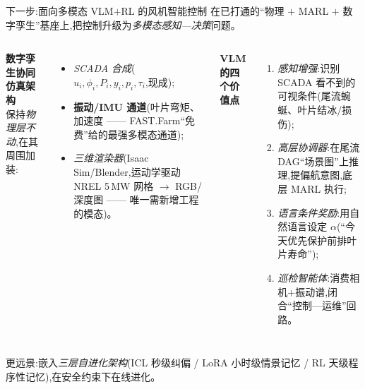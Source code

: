 \documentclass[aspectratio=169,11pt,UTF8]{ctexbeamer}
\newcommand{\emphb}[1]{\textcolor{myred}{\textbf{#1}}}
\begin{document}
\begin{frame}{下一步:面向多模态 VLM$+$RL 的风机智能控制}
\small
在已打通的“物理 $+$ MARL $+$ 数字孪生”基座上,把控制升级为\emph{多模态感知—决策}问题。
\begin{columns}[T]
\textbf{数字孪生协同仿真架构}\\
保持\emph{物理层不动},在其周围加装:
\begin{itemize}\setlength\itemsep{1pt}
  \item \emph{SCADA 合成}($u_i,\phi_i,P_i,y_i,p_i,\tau_i$,现成);
  \item \emphb{振动/IMU 通道}(叶片弯矩、加速度 —— FAST.Farm“免费”给的最强多模态通道);
  \item \emph{三维渲染器}(Isaac Sim/Blender,运动学驱动 NREL 5\,MW 网格 $\to$ RGB/深度图 —— 唯一需新增工程的模态)。
\end{itemize}
\textbf{VLM 的四个价值点}
\begin{enumerate}\setlength\itemsep{1pt}
  \item \emph{感知增强}:识别 SCADA 看不到的可视条件(尾流蜿蜒、叶片结冰/损伤);
  \item \emph{高层协调器}:在尾流 DAG“场景图”上推理,提偏航意图,底层 MARL 执行;
  \item \emph{语言条件奖励}:用自然语言设定 $\alpha$(“今天优先保护前排叶片寿命”);
  \item \emph{巡检智能体}:消费相机+振动谱,闭合“控制—运维”回路。
\end{enumerate}
\end{columns}
\vspace{1mm}
\centering\footnotesize\color{mygray}
更远景:嵌入\emph{三层自进化架构}(ICL 秒级纠偏 / LoRA 小时级情景记忆 / RL 天级程序性记忆),在安全约束下在线进化。
\end{frame}
\end{document}
